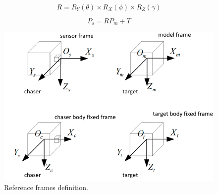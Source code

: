 \documentclass[conference]{IEEEtran}
\begin{document}
		\begin{equation}
			\label{eqn:R}
			R = R_Y(\theta) \times R_X(\phi) \times R_Z(\gamma)
		\end{equation}
	
		\begin{equation}
			\label{eqn:Ps}
			P_s = RP_m + T
		\end{equation}
	
	\begin{figure}[htbp]
		\centerline{\includegraphics[scale=0.95]{Images/ReferenceFrames.PNG}}
		\caption{Reference frames definition.}
		\label{ReferenceFrames}
	\end{figure}
\end{document}
